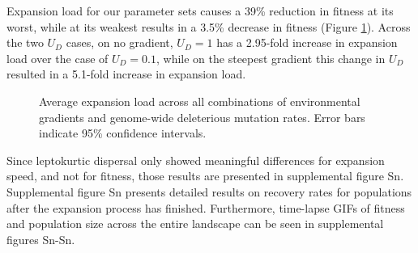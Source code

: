 Expansion load for our parameter sets causes a 39\% reduction in fitness at its worst, while at its weakest results in a 3.5\% decrease in fitness (Figure \ref{fig:load}). %
Across the two $U_D$ cases, on no gradient, $U_D = 1$ has a 2.95-fold increase in expansion load over the case of $U_D = 0.1$, while on the steepest gradient this change in $U_D$ resulted in a 5.1-fold increase in expansion load.

\begin{figure}[h]
\centering
{}
\caption[Average expansion load.]{Average expansion load across all combinations of environmental gradients and genome-wide deleterious mutation rates. Error bars indicate 95\% confidence intervals.}
\label{fig:load}
\end{figure}


Since leptokurtic dispersal only showed meaningful differences for expansion speed, and not for fitness, those results are presented in supplemental figure \color{red}Sn\color{black}. Supplemental figure \color{red}Sn \color{black} presents detailed results on recovery rates for populations after the expansion process has finished. Furthermore, time-lapse GIFs of fitness and population size across the entire landscape can be seen in supplemental figures \color{red}Sn-Sn\color{black}.


